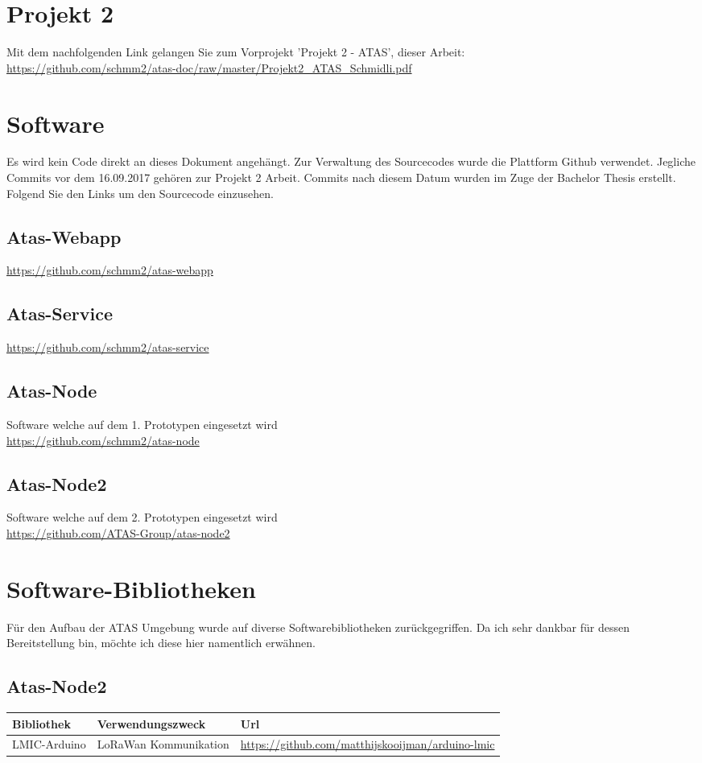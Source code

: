 \documentclass[11pt,english,german]{report}
\theoremstyle{definition}
\begin{document}
\section{Projekt 2}
Mit dem nachfolgenden Link gelangen Sie zum Vorprojekt 'Projekt 2 - ATAS', dieser Arbeit:\\ \url{https://github.com/schmm2/atas-doc/raw/master/Projekt2_ATAS_Schmidli.pdf}
\section{Software}
Es wird kein Code direkt an dieses Dokument angehängt. Zur Verwaltung des Sourcecodes wurde die Plattform Github verwendet. Jegliche Commits vor dem 16.09.2017 gehören zur Projekt 2 Arbeit. Commits nach diesem Datum wurden im Zuge der Bachelor Thesis erstellt. 
Folgend Sie den Links um den Sourcecode einzusehen.
\subsection{Atas-Webapp}
\url{https://github.com/schmm2/atas-webapp}
\subsection{Atas-Service}
\url{https://github.com/schmm2/atas-service}
\subsection{Atas-Node}
Software welche auf dem 1. Prototypen eingesetzt wird\\
\url{https://github.com/schmm2/atas-node}
\subsection{Atas-Node2}
Software welche auf dem 2. Prototypen eingesetzt wird\\
\url{https://github.com/ATAS-Group/atas-node2}

\newpage
\section{Software-Bibliotheken}
Für den Aufbau der ATAS Umgebung wurde auf diverse Softwarebibliotheken zurückgegriffen. Da ich sehr dankbar für dessen Bereitstellung bin, möchte ich diese hier namentlich erwähnen.

\subsection{Atas-Node2}
\begin{tabularx}{\linewidth}{XXX}
	\textbf{Bibliothek} & \textbf{Verwendungszweck} & \textbf{Url} \\ \hline
	LMIC-Arduino & LoRaWan Kommunikation & \url{https://github.com/matthijskooijman/arduino-lmic}\\ \hline
\end{tabularx} 
\end{document}
